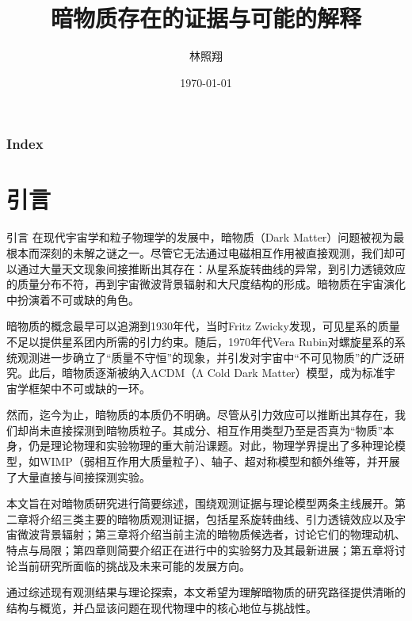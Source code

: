 \documentclass{beamer} %
\title{暗物质存在的证据与可能的解释 } %
\author{林照翔  } %
\date{\today} %
\begin{document}
\songti %
\everymath{\displaystyle}

\begin{frame}
    \titlepage %
\end{frame}

\begin{frame}
    \frametitle{\textbf{Index}}
    \begin{multicols}{2}
    \tableofcontents
    \end{multicols}
\end{frame}

\section{引言}

\begin{frame}{引言}
在现代宇宙学和粒子物理学的发展中，暗物质（Dark Matter）问题被视为最根本而深刻的未解之谜之一。尽管它无法通过电磁相互作用被直接观测，我们却可以通过大量天文现象间接推断出其存在：从星系旋转曲线的异常，到引力透镜效应的质量分布不符，再到宇宙微波背景辐射和大尺度结构的形成。暗物质在宇宙演化中扮演着不可或缺的角色。

暗物质的概念最早可以追溯到1930年代，当时Fritz Zwicky发现，可见星系的质量不足以提供星系团内所需的引力约束。随后，1970年代Vera Rubin对螺旋星系的系统观测进一步确立了“质量不守恒”的现象，并引发对宇宙中“不可见物质”的广泛研究。此后，暗物质逐渐被纳入ΛCDM（Λ Cold Dark Matter）模型，成为标准宇宙学框架中不可或缺的一环。
\end{frame}

\begin{frame}
然而，迄今为止，暗物质的本质仍不明确。尽管从引力效应可以推断出其存在，我们却尚未直接探测到暗物质粒子。其成分、相互作用类型乃至是否真为“物质”本身，仍是理论物理和实验物理的重大前沿课题。对此，物理学界提出了多种理论模型，如WIMP（弱相互作用大质量粒子）、轴子、超对称模型和额外维等，并开展了大量直接与间接探测实验。

本文旨在对暗物质研究进行简要综述，围绕观测证据与理论模型两条主线展开。第二章将介绍三类主要的暗物质观测证据，包括星系旋转曲线、引力透镜效应以及宇宙微波背景辐射；第三章将介绍当前主流的暗物质候选者，讨论它们的物理动机、特点与局限；第四章则简要介绍正在进行中的实验努力及其最新进展；第五章将讨论当前研究所面临的挑战及未来可能的发展方向。

通过综述现有观测结果与理论探索，本文希望为理解暗物质的研究路径提供清晰的结构与概览，并凸显该问题在现代物理中的核心地位与挑战性。
\end{frame}
\end{document}
